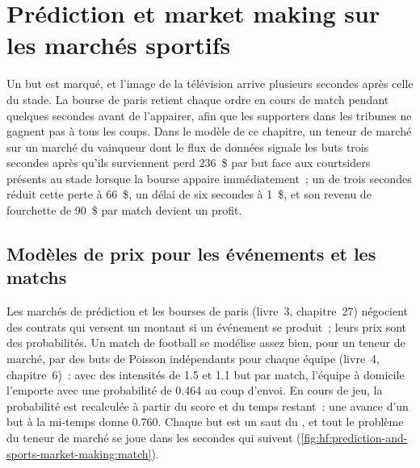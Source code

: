 \chapter{Prédiction et market making sur les marchés sportifs}\label{ch:hf:prediction-and-sports-market-making}

Un but est marqué, et l'image de la télévision arrive plusieurs secondes après celle du stade. La bourse de paris retient chaque ordre en cours de match pendant quelques
secondes avant de l'appairer, afin que les supporters dans les tribunes ne gagnent pas à tous les coups. Dans le modèle de ce chapitre, un teneur de marché sur un marché du vainqueur
dont le flux de données signale les buts trois secondes après qu'ils surviennent perd 236~\$ par but face aux courtsiders présents au stade lorsque la bourse appaire immédiatement~;
un  de trois secondes réduit cette perte à 66~\$, un délai de six secondes à 1~\$, et son revenu de fourchette de 90~\$ par match devient un profit.

\section{Modèles de prix pour les événements et les matchs}

Les marchés de prédiction et les bourses de paris (livre~3, chapitre~27) négocient des contrats qui versent un montant si un événement se produit~; leurs prix sont
des probabilités. Un match de football se modélise assez bien, pour un teneur de marché, par des buts de Poisson indépendants pour chaque équipe (livre~4, chapitre~6)~: avec
des intensités de 1.5 et 1.1 but par match, l'équipe à domicile l'emporte avec une probabilité de 0.464 au coup d'envoi. En cours de jeu, la probabilité est recalculée à partir du
score et du temps restant~: une avance d'un but à la mi-temps donne 0.760. Chaque but est un saut du , et tout le problème du teneur de marché se joue
dans les secondes qui suivent (\cref{fig:hf:prediction-and-sports-market-making:match}).

